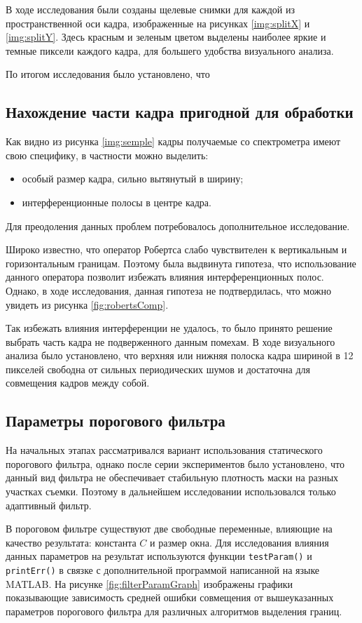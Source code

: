 В ходе исследования были созданы щелевые снимки для каждой из пространственной оси кадра, изображенные на рисунках \ref{img:splitX} и \ref{img:splitY}. Здесь красным и зеленым цветом выделены наиболее яркие и темные пиксели каждого кадра, для большего удобства визуального анализа.

По итогом исследования было установлено, что 
\subsection{Нахождение части кадра пригодной для обработки}
Как видно из рисунка \ref{img:semple} кадры получаемые со спектрометра имеют свою специфику, в частности можно выделить:
\begin{itemize}
	\item особый размер кадра, сильно вытянутый в ширину;
	\item интерференционные полосы в центре кадра. 
\end{itemize}
Для преодоления данных проблем потребовалось дополнительное исследование.

Широко известно, что оператор Робертса слабо чувствителен к вертикальным и горизонтальным границам. Поэтому была выдвинута гипотеза, что использование данного оператора позволит избежать влияния интерференционных полос. Однако, в ходе исследования, данная гипотеза не подтвердилась, что можно увидеть из рисунка \ref{fig:robertsComp}.

Так избежать влияния интерференции не удалось, то было принято решение выбрать часть кадра не подверженного данным помехам. В ходе визуального анализа было установлено, что верхняя или нижняя полоска кадра шириной в 12 пикселей свободна от сильных периодических шумов и достаточна для совмещения кадров между собой. 
\subsection{Параметры порогового фильтра}
На начальных этапах рассматривался вариант использования статического порогового фильтра, однако после серии экспериментов было установлено, что данный вид фильтра не обеспечивает стабильную плотность маски на разных участках съемки. Поэтому в дальнейшем исследовании использовался только адаптивный фильтр.

В пороговом фильтре существуют две свободные переменные, влияющие на качество результата: константа $C$ и размер окна. Для исследования влияния данных параметров на результат используются функции \texttt{testParam()} и \texttt{printErr()} в связке с дополнительной программой написанной на языке MATLAB. На рисунке \ref{fig:filterParamGraph} изображены графики показывающие зависимость средней ошибки совмещения от вышеуказанных параметров порогового фильтра для различных алгоритмов выделения границ.
